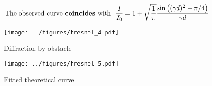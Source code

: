 \phantom{42}

\vspace{-10mm}
\begin{equation*}
    \text{The observed curve \textbf{coincides} with \ }
    \frac{I}{I_0} = 1 + 
    \sqrt{\frac{1}{\pi}} \frac{\sin\left((\gamma d)^2 - \pi/4\right)}{\gamma d}
\end{equation*}

\vspace{-4mm}
\begin{figure}[h]
    \begin{minipage}{0.48\textwidth}
            \hspace{-0.5cm}
            \texttt{[image: ../figures/fresnel\_4.pdf]}
            \vspace{-1.2cm}
            \caption{Diffraction by obstacle}
    \end{minipage}
    \hfill
    \begin{minipage}{0.48\textwidth}
        \hspace{-0.5cm}
        \texttt{[image: ../figures/fresnel\_5.pdf]}
        \vspace{-1.2cm}
        \caption{Fitted theoretical curve}
    \end{minipage}
\end{figure}

